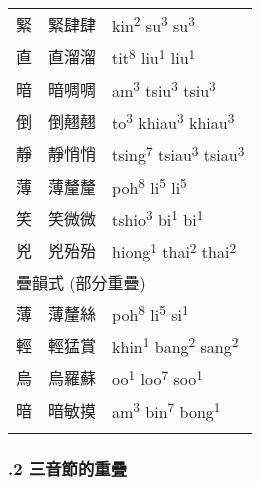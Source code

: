 \begin{tabularx}{\textwidth}{XXX}
 緊 & 緊肆肆 & {\sffamily \textrm{kin}\textrm{\textsuperscript{2}} \textrm{su}\textrm{\textsuperscript{3}} \textrm{su}\textrm{\textsuperscript{3}}}\\
 直 & 直溜溜 & {\sffamily \textrm{tit}\textrm{\textsuperscript{8}} \textrm{liu}\textrm{\textsuperscript{1}} \textrm{liu}\textrm{\textsuperscript{1}}}\\
 暗 & 暗啁啁 & {\sffamily \textrm{am}\textrm{\textsuperscript{3}} \textrm{tsiu}\textrm{\textsuperscript{3}} \textrm{tsiu}\textrm{\textsuperscript{3}}}\\
 倒 & 倒翹翹 & {\sffamily \textrm{to}\textrm{\textsuperscript{3}} \textrm{khiau}\textrm{\textsuperscript{3}} \textrm{khiau}\textrm{\textsuperscript{3}}}\\
 靜 & 靜悄悄 & {\sffamily \textrm{tsing}\textrm{\textsuperscript{7}} \textrm{tsiau}\textrm{\textsuperscript{3}} \textrm{tsiau}\textrm{\textsuperscript{3}}}\\
 薄 & 薄釐釐 & {\sffamily \textrm{poh}\textrm{\textsuperscript{8}} \textrm{li}\textrm{\textsuperscript{5}} \textrm{li}\textrm{\textsuperscript{5}}}\\
 笑 & 笑微微 & {\sffamily \textrm{tshio}\textrm{\textsuperscript{3}} \textrm{bi}\textrm{\textsuperscript{1}} \textrm{bi}\textrm{\textsuperscript{1}}}\\
 兇 & 兇殆殆 & {\sffamily \textrm{hiong}\textrm{\textsuperscript{1}} \textrm{thai}\textrm{\textsuperscript{2}} \textrm{thai}\textrm{\textsuperscript{2}}}\\
\multicolumn{3}{X}{ 疊韻式 (部分重疊)}\\
 薄 & 薄釐絲 & {\sffamily \textrm{poh}\textrm{\textsuperscript{8}} \textrm{li}\textrm{\textsuperscript{5}} \textrm{si}\textrm{\textsuperscript{1}}}\\
 輕 & 輕猛賞 & {\sffamily \textrm{khin}\textrm{\textsuperscript{1}} \textrm{bang}\textrm{\textsuperscript{2}} \textrm{sang}\textrm{\textsuperscript{2}}}\\
 烏 & 烏羅蘇 & {\sffamily \textrm{oo}\textrm{\textsuperscript{1}} \textrm{loo}\textrm{\textsuperscript{7}} \textrm{soo}\textrm{\textsuperscript{1}}}\\
 暗 & 暗敏摸 & {\sffamily \textrm{am}\textrm{\textsuperscript{3} }\textrm{bin}\textrm{\textsuperscript{7}} \textrm{bong}\textrm{\textsuperscript{1}}}\\
\lspbottomrule
\end{tabularx}
\subsubsection{.2 三音節的重疊}

